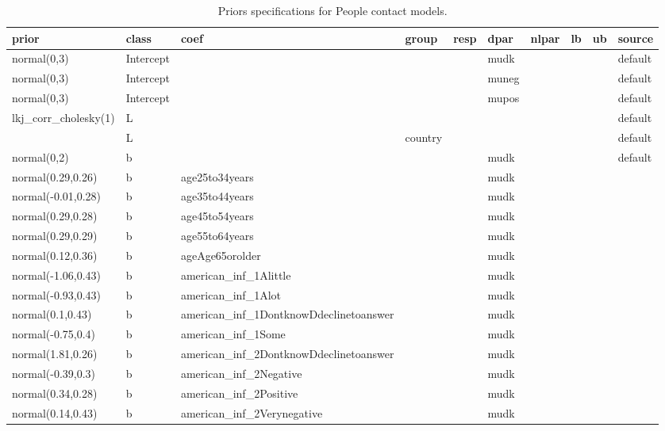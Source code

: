 \documentclass[
]{book}
\theoremstyle{definition}
\theoremstyle{definition}
\theoremstyle{definition}
\theoremstyle{definition}
\theoremstyle{remark}
\begin{document}
\begin{table}

\caption{\label{tab:prior-info-people}Priors specifications for People contact models.}
\centering
\fontsize{11}{13}\selectfont
\begin{tabular}[t]{l|l|l|l|l|l|l|l|l|l}
\hline
prior & class & coef & group & resp & dpar & nlpar & lb & ub & source\\
\hline
normal(0,3) & Intercept &  &  &  & mudk &  &  &  & default\\
\hline
normal(0,3) & Intercept &  &  &  & muneg &  &  &  & default\\
\hline
normal(0,3) & Intercept &  &  &  & mupos &  &  &  & default\\
\hline
lkj\_corr\_cholesky(1) & L &  &  &  &  &  &  &  & default\\
\hline
 & L &  & country &  &  &  &  &  & default\\
\hline
normal(0,2) & b &  &  &  & mudk &  &  &  & default\\
\hline
normal(0.29,0.26) & b & age25to34years &  &  & mudk &  &  &  & \\
\hline
normal(-0.01,0.28) & b & age35to44years &  &  & mudk &  &  &  & \\
\hline
normal(0.29,0.28) & b & age45to54years &  &  & mudk &  &  &  & \\
\hline
normal(0.29,0.29) & b & age55to64years &  &  & mudk &  &  &  & \\
\hline
normal(0.12,0.36) & b & ageAge65orolder &  &  & mudk &  &  &  & \\
\hline
normal(-1.06,0.43) & b & american\_inf\_1Alittle &  &  & mudk &  &  &  & \\
\hline
normal(-0.93,0.43) & b & american\_inf\_1Alot &  &  & mudk &  &  &  & \\
\hline
normal(0.1,0.43) & b & american\_inf\_1DontknowDdeclinetoanswer &  &  & mudk &  &  &  & \\
\hline
normal(-0.75,0.4) & b & american\_inf\_1Some &  &  & mudk &  &  &  & \\
\hline
normal(1.81,0.26) & b & american\_inf\_2DontknowDdeclinetoanswer &  &  & mudk &  &  &  & \\
\hline
normal(-0.39,0.3) & b & american\_inf\_2Negative &  &  & mudk &  &  &  & \\
\hline
normal(0.34,0.28) & b & american\_inf\_2Positive &  &  & mudk &  &  &  & \\
\hline
normal(0.14,0.43) & b & american\_inf\_2Verynegative &  &  & mudk &  &  &  & \\

\end{tabular}
\end{table}
\end{document}
